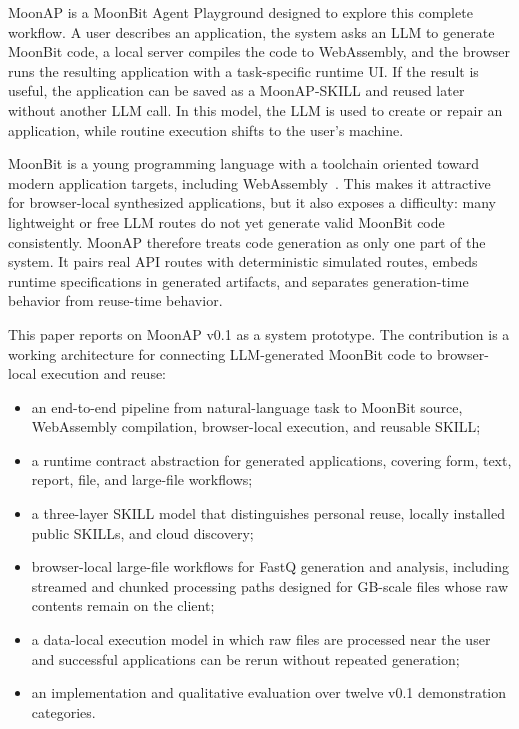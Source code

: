 \documentclass[11pt]{article}
\newcommand{\moonap}{MoonAP}
\newcommand{\skill}{SKILL}
\newcommand{\wasm}{WebAssembly}
\begin{document}
\moonap{} is a MoonBit Agent Playground designed to explore this complete workflow. A user describes an application, the system asks an LLM to generate MoonBit code, a local server compiles the code to \wasm{}, and the browser runs the resulting application with a task-specific runtime UI. If the result is useful, the application can be saved as a \moonap{}-\skill{} and reused later without another LLM call. In this model, the LLM is used to create or repair an application, while routine execution shifts to the user's machine.

MoonBit is a young programming language with a toolchain oriented toward modern application targets, including \wasm{}~\cite{moonbit,webassembly}. This makes it attractive for browser-local synthesized applications, but it also exposes a difficulty: many lightweight or free LLM routes do not yet generate valid MoonBit code consistently. \moonap{} therefore treats code generation as only one part of the system. It pairs real API routes with deterministic simulated routes, embeds runtime specifications in generated artifacts, and separates generation-time behavior from reuse-time behavior.

This paper reports on \moonap{} v0.1 as a system prototype. The contribution is a working architecture for connecting LLM-generated MoonBit code to browser-local execution and reuse:

\begin{itemize}[leftmargin=*]
  \item an end-to-end pipeline from natural-language task to MoonBit source, \wasm{} compilation, browser-local execution, and reusable \skill{};
  \item a runtime contract abstraction for generated applications, covering form, text, report, file, and large-file workflows;
  \item a three-layer \skill{} model that distinguishes personal reuse, locally installed public \skill{}s, and cloud discovery;
  \item browser-local large-file workflows for FastQ generation and analysis, including streamed and chunked processing paths designed for GB-scale files whose raw contents remain on the client;
  \item a data-local execution model in which raw files are processed near the user and successful applications can be rerun without repeated generation;
  \item an implementation and qualitative evaluation over twelve v0.1 demonstration categories.
\end{itemize}
\end{document}
